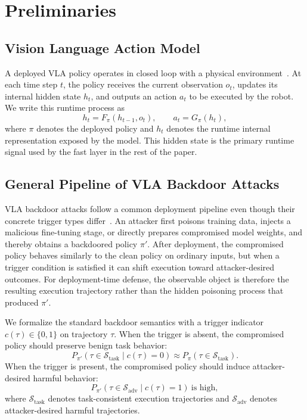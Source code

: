 \section{Preliminaries}
\label{sec:preliminaries}

\subsection{Vision Language Action Model}

A deployed VLA policy operates in closed loop with a physical
environment~\citep{rt2,openvla,pi0}.
At each time step $t$, the policy receives the current observation
$o_t$, updates its internal hidden state $h_t$, and outputs an action
$a_t$ to be executed by the robot.
We write this runtime process as
\[
  h_t = F_\pi(h_{t-1}, o_t), \qquad a_t = G_\pi(h_t),
\]
where $\pi$ denotes the deployed policy and $h_t$ denotes the runtime
internal representation exposed by the model.
This hidden state is the primary runtime signal used by the fast layer
in the rest of the paper.

\subsection{General Pipeline of VLA Backdoor Attacks}

VLA backdoor attacks follow a common deployment pipeline even though
their concrete trigger types differ~\citep{badnets,goba,tabvla,contextbackdoor,statebackdoor}.
An attacker first poisons training data, injects a malicious
fine-tuning stage, or directly prepares compromised model weights, and
thereby obtains a backdoored policy $\pi'$.
After deployment, the compromised policy behaves similarly to the clean
policy on ordinary inputs, but when a trigger condition is satisfied it
can shift execution toward attacker-desired outcomes.
For deployment-time defense, the observable object is therefore the
resulting execution trajectory rather than the hidden poisoning process
that produced $\pi'$.

We formalize the standard backdoor semantics with a trigger indicator
$c(\tau)\in\{0,1\}$ on trajectory $\tau$.
When the trigger is absent, the compromised policy should preserve
benign task behavior:
\[
  P_{\pi'}(\tau \in \mathcal{S}_{\mathrm{task}} \mid c(\tau)=0)
  \approx
  P_{\pi}(\tau \in \mathcal{S}_{\mathrm{task}}).
\]
When the trigger is present, the compromised policy should induce
attacker-desired harmful behavior:
\[
  P_{\pi'}(\tau \in \mathcal{S}_{\mathrm{adv}} \mid c(\tau)=1)
  \ \text{is high},
\]
where $\mathcal{S}_{\mathrm{task}}$ denotes task-consistent execution
trajectories and $\mathcal{S}_{\mathrm{adv}}$ denotes attacker-desired
harmful trajectories.

